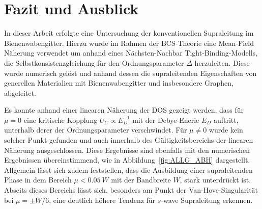 \chapter{Fazit und Ausblick}\label{sec:fazit}




In dieser Arbeit erfolgte eine Untersuchung der konventionellen Supraleitung im Bienenwabengitter.
Hierzu wurde im Rahmen der BCS-Theorie eine Mean-Field Näherung verwendet um anhand eines Nächsten-Nachbar Tight-Binding-Modells, 
die Selbstkonsistenzgleichung für den Ordnungsparameter $\Delta$ herzuleiten.
Diese wurde numerisch gelöst und anhand dessen die supraleitenden Eigenschaften von generellen Materialien mit Bienenwabengitter und insbesondere Graphen, abgeleitet.

Es konnte anhand einer linearen Näherung der DOS gezeigt werden, dass für $\mu = 0$ eine kritische Kopplung $U_C \propto E_D^{-1}$ mit der Debye-Enerie $E_D$ auftritt, unterhalb derer der Ordnungsparameter verschwindet.
Für $\mu \neq 0$ wurde kein solcher Punkt gefunden und auch innerhalb des Gültigkeitsbereichs der linearen Näherung ausgeschlossen.
Diese Ergebnisse sind ebenfalls mit den numerischen Ergebnissen übereinstimmend, wie in Abbildung~\ref{fig:ALLG_ABH} dargestellt.
Allgemein lässt sich zudem feststellen, dass die Ausbildung einer supraleitenden Phase in dem Bereich $\mu < \qty{0.05}{W}$ mit der Bandbreite $W$, stark unterdrückt ist.
Abseits dieses Bereichs lässt sich, besonders am Punkt der Van-Hove-Singularität bei $\mu =\pm W/6$,  eine deutlich höhere Tendenz für $s$-wave Supraleitung erkennen.

